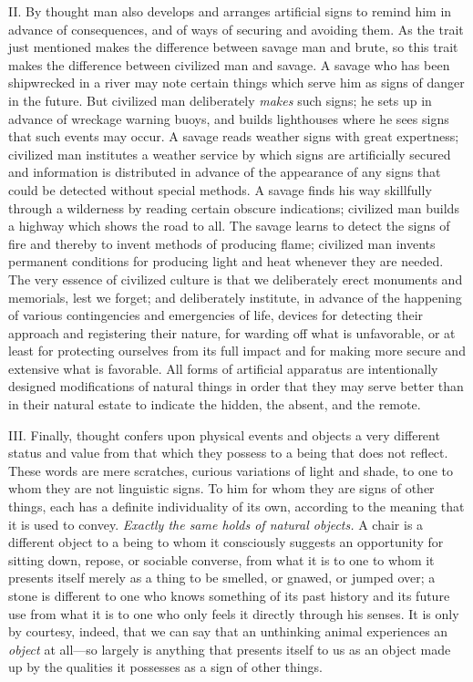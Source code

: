 \documentclass[showtrims,ustradepaper]{memoir}
\begin{document}
II. By thought man also develops and arranges artificial signs to remind
him in advance of consequences, and of ways of securing and avoiding
them. As the trait just mentioned makes the difference between savage
man and brute, so this trait makes the difference between civilized man
and savage. A savage who has been shipwrecked in a river may note
certain things
which
serve him as signs of danger in the future. But civilized man
deliberately \emph{makes} such signs; he sets up in advance of wreckage
warning buoys, and builds lighthouses where he sees signs that such
events may occur. A savage reads weather signs with great expertness;
civilized man institutes a weather service by which signs are
artificially secured and information is distributed in advance of the
appearance of any signs that could be detected without special methods.
A savage finds his way skillfully through a wilderness by reading
certain obscure indications; civilized man builds a highway which shows
the road to all. The savage learns to detect the signs of fire and
thereby to invent methods of producing flame; civilized man invents
permanent conditions for producing light and heat whenever they are
needed. The very essence of civilized culture is that we deliberately
erect monuments and memorials, lest we forget; and deliberately
institute, in advance of the happening of various contingencies and
emergencies of life, devices for detecting their approach and
registering their nature, for warding off what is unfavorable, or at
least for protecting ourselves from its full impact and for making more
secure and extensive what is favorable. All forms of artificial
apparatus are intentionally designed modifications of natural things in
order that they may serve better than in their natural estate to
indicate the hidden, the absent, and the remote.


III. Finally, thought confers upon physical events and objects a very
different status and value from that which they possess to a being that
does not reflect. These words are mere scratches, curious variations of
light and shade, to one to whom they are not linguistic signs. To him
for whom they are signs of other
things,
each has a definite individuality of its own, according to the meaning
that it is used to convey. \emph{Exactly the same holds of natural
objects.} A chair is a different object to a being to whom it
consciously suggests an opportunity for sitting down, repose, or
sociable converse, from what it is to one to whom it presents itself
merely as a thing to be smelled, or gnawed, or jumped over; a stone is
different to one who knows something of its past history and its future
use from what it is to one who only feels it directly through his
senses. It is only by courtesy, indeed, that we can say that an
unthinking animal experiences an \emph{object} at all---so largely is
anything that presents itself to us as an object made up by the
qualities it possesses as a sign of other things.
\end{document}
